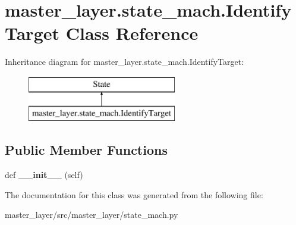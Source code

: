 \hypertarget{classmaster__layer_1_1state__mach_1_1IdentifyTarget}{}\section{master\+\_\+layer.\+state\+\_\+mach.\+Identify\+Target Class Reference}
\label{classmaster__layer_1_1state__mach_1_1IdentifyTarget}
Inheritance diagram for master\+\_\+layer.\+state\+\_\+mach.\+Identify\+Target\+:\begin{figure}[H]
\begin{center}
\leavevmode
\includegraphics[height=2.000000cm]{classmaster__layer_1_1state__mach_1_1IdentifyTarget}
\end{center}
\end{figure}
\subsection*{Public Member Functions}
\begin{DoxyCompactItemize}
\item 
\mbox{\label{classmaster__layer_1_1state__mach_1_1IdentifyTarget_ac7a4630888de1c173fc6188ad61a237d}} 
def {\bfseries \+\_\+\+\_\+init\+\_\+\+\_\+} (self)
\end{DoxyCompactItemize}


The documentation for this class was generated from the following file\+:\begin{DoxyCompactItemize}
\item 
master\+\_\+layer/src/master\+\_\+layer/state\+\_\+mach.\+py\end{DoxyCompactItemize}
